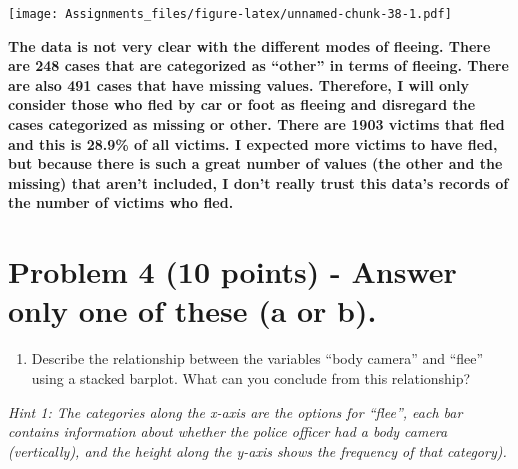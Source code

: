 \documentclass[
]{article}
\newenvironment{Shaded}{\begin{snugshade}}{\end{snugshade}}
\newcommand{\AttributeTok}[1]{\textcolor[rgb]{0.77,0.63,0.00}{#1}}
\newcommand{\CommentTok}[1]{\textcolor[rgb]{0.56,0.35,0.01}{\textit{#1}}}
\newcommand{\ConstantTok}[1]{\textcolor[rgb]{0.00,0.00,0.00}{#1}}
\newcommand{\FunctionTok}[1]{\textcolor[rgb]{0.00,0.00,0.00}{#1}}
\newcommand{\NormalTok}[1]{#1}
\newcommand{\OtherTok}[1]{\textcolor[rgb]{0.56,0.35,0.01}{#1}}
\newcommand{\SpecialCharTok}[1]{\textcolor[rgb]{0.00,0.00,0.00}{#1}}
\newcommand{\StringTok}[1]{\textcolor[rgb]{0.31,0.60,0.02}{#1}}
\providecommand{\tightlist}{%
  \setlength{\itemsep}{0pt}\setlength{\parskip}{0pt}}
\begin{document}
\begin{Shaded}
\end{Shaded}

\texttt{[image: Assignments\_files/figure-latex/unnamed-chunk-38-1.pdf]}

\textbf{The data is not very clear with the different modes of fleeing.
There are 248 cases that are categorized as ``other'' in terms of
fleeing. There are also 491 cases that have missing values. Therefore, I
will only consider those who fled by car or foot as fleeing and
disregard the cases categorized as missing or other. There are 1903
victims that fled and this is 28.9\% of all victims. I expected more
victims to have fled, but because there is such a great number of values
(the other and the missing) that aren't included, I don't really trust
this data's records of the number of victims who fled.}

\hypertarget{problem-4-10-points---answer-only-one-of-these-a-or-b.}{%
\section{Problem 4 (10 points) - Answer only one of these (a or
b).}\label{problem-4-10-points---answer-only-one-of-these-a-or-b.}}

\begin{enumerate}
\def\labelenumi{\alph{enumi}.}
\tightlist
\item
  Describe the relationship between the variables ``body camera'' and
  ``flee'' using a stacked barplot. What can you conclude from this
  relationship?
\end{enumerate}

\emph{Hint 1: The categories along the x-axis are the options for
``flee'', each bar contains information about whether the police officer
had a body camera (vertically), and the height along the y-axis shows
the frequency of that category).}
\end{document}
